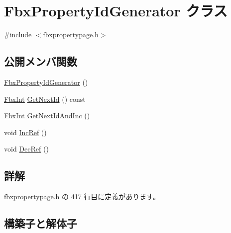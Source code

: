 \hypertarget{class_fbx_property_id_generator}{}\section{Fbx\+Property\+Id\+Generator クラス}
\label{class_fbx_property_id_generator}


{\ttfamily \#include $<$fbxpropertypage.\+h$>$}

\subsection*{公開メンバ関数}
\begin{DoxyCompactItemize}
\item 
\hyperlink{class_fbx_property_id_generator_ad86e7c1dcd8a4bc039accf8c4993938a}{Fbx\+Property\+Id\+Generator} ()
\item 
\hyperlink{fbxtypes_8h_a088fa96de3b0b3ea69f0f6afef525dfb}{Fbx\+Int} \hyperlink{class_fbx_property_id_generator_a39bb3de3a2a11a1a281ee1e98a0035db}{Get\+Next\+Id} () const
\item 
\hyperlink{fbxtypes_8h_a088fa96de3b0b3ea69f0f6afef525dfb}{Fbx\+Int} \hyperlink{class_fbx_property_id_generator_a77a349020d3d25a78b19131b2c62aaa9}{Get\+Next\+Id\+And\+Inc} ()
\item 
void \hyperlink{class_fbx_property_id_generator_ac1834015b7a1fa1fe47ebf93737b03e0}{Inc\+Ref} ()
\item 
void \hyperlink{class_fbx_property_id_generator_a64a7faa5d20848c3d8817a6c01ed0298}{Dec\+Ref} ()
\end{DoxyCompactItemize}


\subsection{詳解}


 fbxpropertypage.\+h の 417 行目に定義があります。



\subsection{構築子と解体子}
\mbox{\label{class_fbx_property_id_generator_ad86e7c1dcd8a4bc039accf8c4993938a}} 
